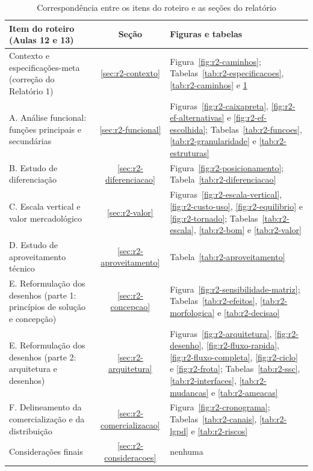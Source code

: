 \begin{table}[htbp]
    \centering
    \caption{Correspondência entre os itens do roteiro e as seções do relatório}
    \label{tab:r2-roteiro}
    \footnotesize
    \renewcommand{\arraystretch}{1.25}
    \begin{tabularx}{\textwidth}{@{}
        >{\RaggedRight\arraybackslash}p{6.2cm}
        c
        >{\RaggedRight\arraybackslash}X@{}}
        \toprule
        \textbf{Item do roteiro (Aulas 12 e 13)} & \textbf{Seção} & \textbf{Figuras e tabelas} \\
        \midrule
        Contexto e especificações-meta (correção do Relatório 1) & \ref{sec:r2-contexto} & Figura~\ref{fig:r2-caminhos}; Tabelas~\ref{tab:r2-especificacoes}, \ref{tab:r2-caminhos} e \ref{tab:r2-roteiro} \\
        A. Análise funcional: funções principais e secundárias & \ref{sec:r2-funcional} & Figuras~\ref{fig:r2-caixapreta}, \ref{fig:r2-ef-alternativas} e \ref{fig:r2-ef-escolhida}; Tabelas~\ref{tab:r2-funcoes}, \ref{tab:r2-granularidade} e \ref{tab:r2-estruturas} \\
        B. Estudo de diferenciação & \ref{sec:r2-diferenciacao} & Figura~\ref{fig:r2-posicionamento}; Tabela~\ref{tab:r2-diferenciacao} \\
        C. Escala vertical e valor mercadológico & \ref{sec:r2-valor} & Figuras~\ref{fig:r2-escala-vertical}, \ref{fig:r2-custo-uso}, \ref{fig:r2-equilibrio} e \ref{fig:r2-tornado}; Tabelas~\ref{tab:r2-escala}, \ref{tab:r2-bom} e \ref{tab:r2-valor} \\
        D. Estudo de aproveitamento técnico & \ref{sec:r2-aproveitamento} & Tabela~\ref{tab:r2-aproveitamento} \\
        E. Reformulação dos desenhos (parte 1: princípios de solução e concepção) & \ref{sec:r2-concepcao} & Figura~\ref{fig:r2-sensibilidade-matriz}; Tabelas~\ref{tab:r2-efeitos}, \ref{tab:r2-morfologica} e \ref{tab:r2-decisao} \\
        E. Reformulação dos desenhos (parte 2: arquitetura e desenhos) & \ref{sec:r2-arquitetura} & Figuras~\ref{fig:r2-arquitetura}, \ref{fig:r2-desenho}, \ref{fig:r2-fluxo-rapida}, \ref{fig:r2-fluxo-completa}, \ref{fig:r2-ciclo} e \ref{fig:r2-frota}; Tabelas~\ref{tab:r2-ssc}, \ref{tab:r2-interfaces}, \ref{tab:r2-mudancas} e \ref{tab:r2-ameacas} \\
        F. Delineamento da comercialização e da distribuição & \ref{sec:r2-comercializacao} & Figura~\ref{fig:r2-cronograma}; Tabelas~\ref{tab:r2-canais}, \ref{tab:r2-lgpd} e \ref{tab:r2-riscos} \\
        Considerações finais & \ref{sec:r2-consideracoes} & nenhuma \\
        \bottomrule
    \end{tabularx}
\end{table}

